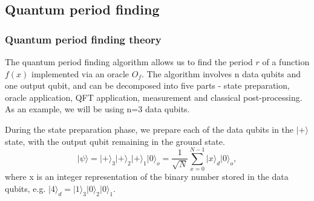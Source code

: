 \documentclass[12pt]{article}
\newcommand{\ket}[1]{\ensuremath{|{#1}\rangle}}
\begin{document}
\subsection{Quantum period finding}

\subsubsection{Quantum period finding theory}
The quantum period finding algorithm allows us to find the period $r$ of a function $f(x)$ implemented via an oracle $O_f$. The algorithm involves n data qubits and one output qubit, and can be decomposed into five parts - state preparation, oracle application, QFT application, measurement and classical post-processing. As an example, we will be using n=3 data qubits.

During the state preparation phase, we prepare each of the data qubits in the $\ket{+}$ state, with the output qubit remaining in the ground state.
\begin{equation}
\ket{\psi} = \ket{+}_3 \ket{+}_2 \ket{+}_1 \ket{0}_o = \frac{1}{\sqrt{N}}\sum_{x=0}^{N-1}\ket{x}_{d}\ket{0}_o,
\end{equation}
where x is an integer representation of the binary number stored in the data qubits, e.g. $\ket{4}_d = \ket{1}_3\ket{0}_2\ket{0}_1$.
\end{document}
